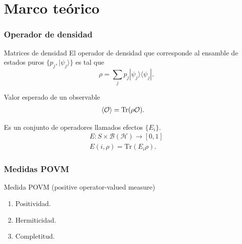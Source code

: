 \documentclass[svgnames,12pt,aspectratio=149]{beamer}
\begin{document}







\section{Marco teórico}
\begin{frame}
 \frametitle{Operador de densidad}
 
 \begin{block}{Matrices de densidad}
  El operador de densidad que corresponde al ensamble de estados puros $ \{p_j,|\psi_j\rangle\}$ es tal que \[\rho=\sum_j p_j |\psi_j\rangle\langle\psi_j|.\]

 \end{block}
 Valor esperado de un observable 
 \begin{equation*}
  \label{expectationvalue_traza}
  \begin{split}
    \langle \mathcal{O} \rangle &= \rm{Tr}(\rho \mathcal{O}).
  \end{split}
\end{equation*}

\end{frame}

\begin{frame}
  Es un conjunto de operadores llamados efectos $\{E_i\}$.
  \begin{equation*}\begin{split}
    E:S\times \mathcal{B(H)}\longrightarrow [0,1]\\
    E (i,\rho)=\text{Tr}(E_i\rho).
\end{split}\end{equation*}

\frametitle{Medidas POVM}
    \begin{block}{Medida POVM (positive operator-valued measure) } 
\begin{enumerate}
    \item Positividad.
    \item Hermiticidad.
    \item  Completitud.
\end{enumerate}
    \end{block}



\end{frame}
\end{document}
